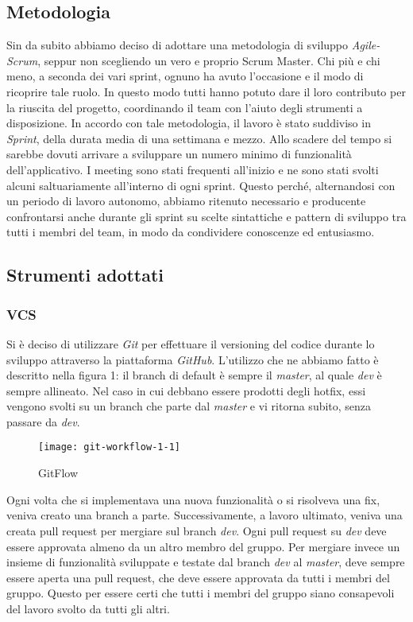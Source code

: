 \subsection{Metodologia}
Sin da subito abbiamo deciso di adottare una metodologia di sviluppo \textit{Agile-Scrum}, seppur non scegliendo un vero e proprio Scrum Master.
Chi più e chi meno, a seconda dei vari sprint, ognuno ha avuto l'occasione e il modo di ricoprire tale ruolo.
In questo modo tutti hanno potuto dare il loro contributo per la riuscita del progetto, coordinando il team con l'aiuto degli strumenti a disposizione.
In accordo con tale metodologia, il lavoro è stato suddiviso in \textit{Sprint}, della durata media di una settimana e mezzo.
Allo scadere del tempo si sarebbe dovuti arrivare a sviluppare un numero minimo di funzionalità dell'applicativo.
I meeting sono stati frequenti all'inizio e ne sono stati svolti alcuni saltuariamente all'interno di ogni sprint.
Questo perché, alternandosi con un periodo di lavoro autonomo, abbiamo ritenuto necessario e producente confrontarsi anche durante gli sprint su scelte sintattiche e pattern di sviluppo tra tutti i membri del team, in modo da condividere conoscenze ed entusiasmo.
\subsection{Strumenti adottati}
\subsubsection{VCS}
Si è deciso di utilizzare \textit{Git} per effettuare il versioning del codice durante lo sviluppo attraverso la piattaforma \textit{GitHub}.
L’utilizzo che ne abbiamo fatto è descritto nella figura 1: il branch di default è sempre il \textit{master}, al quale \textit{dev} è sempre allineato.
Nel caso in cui debbano essere prodotti degli hotfix, essi vengono svolti su un branch che parte dal \textit{master} e vi ritorna subito, senza passare da \textit{dev}.
\begin{figure}
    \centering
    \texttt{[image: git-workflow-1-1]}
    \caption{GitFlow}
\end{figure}
Ogni volta che si implementava una nuova funzionalità o si risolveva una fix, veniva creato una branch a parte.
Successivamente, a lavoro ultimato, veniva una creata pull request per mergiare sul branch \textit{dev}.
Ogni pull request su \textit{dev} deve essere approvata almeno da un altro membro del gruppo.
Per mergiare invece un insieme di funzionalità sviluppate e testate dal branch \textit{dev} al \textit{master}, deve sempre essere aperta una pull request, che deve essere approvata da tutti i membri del gruppo.
Questo per essere certi che tutti i membri del gruppo siano consapevoli del lavoro svolto da tutti gli altri.


